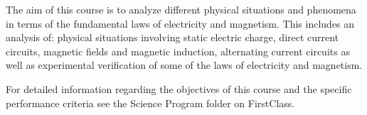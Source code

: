 {The aim of this course is to analyze different physical situations and phenomena in terms of the fundamental laws of electricity and magnetism.  This includes an analysis of: physical situations involving static electric charge, direct current circuits, magnetic fields and magnetic induction, alternating current circuits as well as experimental verification of some of the laws of electricity and magnetism.
\smallskip

For detailed information regarding the objectives of this course and the specific performance criteria see the Science Program folder on FirstClass.}

